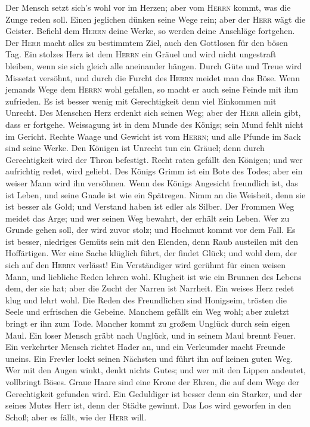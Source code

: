  Der Mensch setzt sich's wohl vor im Herzen; aber vom
\textsc{Herrn} kommt, was die Zunge reden soll.  Einen
jeglichen dünken seine Wege rein; aber der \textsc{Herr} wägt die
Geister.  Befiehl dem \textsc{Herrn} deine Werke, so
werden deine Anschläge fortgehen.  Der \textsc{Herr} macht
alles zu bestimmtem Ziel, auch den Gottlosen für den bösen Tag.
 Ein stolzes Herz ist dem \textsc{Herrn} ein Gräuel und
wird nicht ungestraft bleiben, wenn sie sich gleich alle aneinander
hängen.  Durch Güte und Treue wird Missetat versöhnt, und
durch die Furcht des \textsc{Herrn} meidet man das Böse. 
Wenn jemands Wege dem \textsc{Herrn} wohl gefallen, so macht er auch
seine Feinde mit ihm zufrieden.  Es ist besser wenig mit
Gerechtigkeit denn viel Einkommen mit Unrecht.  Des
Menschen Herz erdenkt sich seinen Weg; aber der \textsc{Herr} allein
gibt, dass er fortgehe.  Weissagung ist in dem Munde des
Königs; sein Mund fehlt nicht im Gericht.  Rechte Waage
und Gewicht ist vom \textsc{Herrn}; und alle Pfunde im Sack sind seine
Werke.  Den Königen ist Unrecht tun ein Gräuel; denn
durch Gerechtigkeit wird der Thron befestigt.  Recht
raten gefällt den Königen; und wer aufrichtig redet, wird geliebt.
 Des Königs Grimm ist ein Bote des Todes; aber ein weiser
Mann wird ihn versöhnen.  Wenn des Königs Angesicht
freundlich ist, das ist Leben, und seine Gnade ist wie ein Spätregen.
 Nimm an die Weisheit, denn sie ist besser als Gold; und
Verstand haben ist edler als Silber.  Der Frommen Weg
meidet das Arge; und wer seinen Weg bewahrt, der erhält sein Leben.
 Wer zu Grunde gehen soll, der wird zuvor stolz; und
Hochmut kommt vor dem Fall.  Es ist besser, niedriges
Gemüts sein mit den Elenden, denn Raub austeilen mit den Hoffärtigen.
 Wer eine Sache klüglich führt, der findet Glück; und
wohl dem, der sich auf den \textsc{Herrn} verlässt!  Ein
Verständiger wird gerühmt für einen weisen Mann, und liebliche Reden
lehren wohl.  Klugheit ist wie ein Brunnen des Lebens
dem, der sie hat; aber die Zucht der Narren ist Narrheit.
 Ein weises Herz redet klug und lehrt wohl.
 Die Reden des Freundlichen sind Honigseim, trösten die
Seele und erfrischen die Gebeine.  Manchem gefällt ein
Weg wohl; aber zuletzt bringt er ihn zum Tode.  Mancher
kommt zu großem Unglück durch sein eigen Maul.  Ein loser
Mensch gräbt nach Unglück, und in seinem Maul brennt Feuer.
 Ein verkehrter Mensch richtet Hader an, und ein
Verleumder macht Freunde uneins.  Ein Frevler lockt
seinen Nächsten und führt ihn auf keinen guten Weg.  Wer
mit den Augen winkt, denkt nichts Gutes; und wer mit den Lippen
andeutet, vollbringt Böses.  Graue Haare sind eine Krone
der Ehren, die auf dem Wege der Gerechtigkeit gefunden wird.
 Ein Geduldiger ist besser denn ein Starker, und der
seines Mutes Herr ist, denn der Städte gewinnt.  Das Los
wird geworfen in den Schoß; aber es fällt, wie der \textsc{Herr} will.


